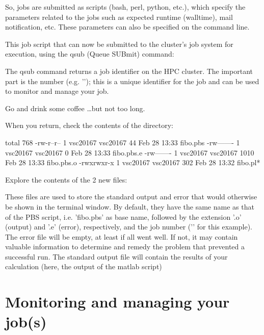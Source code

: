 So, jobs are submitted as scripts (bash, perl, python, etc.), which specify the
parameters related to the jobs such as expected runtime (walltime), mail
notification, etc. These parameters can also be specified on the command line.

This job script that can now be submitted to the cluster's job system for
execution, using the qsub (Queue SUBmit) command:

\begin{prompt}
\end{prompt}

The qsub command returns a job identifier on the HPC cluster. The important
part is the number (e.g. '\jobnumber'); this is a unique identifier for the job
and can be used to monitor and manage your job.

Go and drink some coffee \dots but not too long.

When you return, check the contents of the directory:

\begin{prompt}
total 768
-rw-r--r-- 1 vsc20167 vsc20167   44 Feb 28 13:33 fibo.pbs
-rw------- 1 vsc20167 vsc20167    0 Feb 28 13:33 fibo.pbs.e%
-rw------- 1 vsc20167 vsc20167 1010 Feb 28 13:33 fibo.pbs.o%
-rwxrwxr-x 1 vsc20167 vsc20167  302 Feb 28 13:32 fibo.pl*
\end{prompt}

Explore the contents of the 2 new files:

\begin{prompt}
\end{prompt}

These files are used to store the standard output and error that would
otherwise be shown in the terminal window. By default, they have the same name
as that of the PBS script, i.e. 'fibo.pbs' as base name, followed by the
extension '.o' (output) and '.e' (error), respectively, and the job number
('\jobnumber' for this example). The error file will be empty, at least if all went
well. If not, it may contain valuable information to determine and remedy the
problem that prevented a successful run. The standard output file will contain
the results of your calculation (here, the output of the matlab script)

\section{Monitoring and managing your job(s)}

